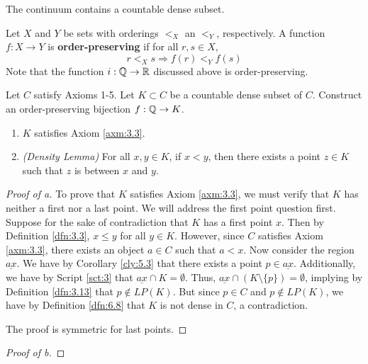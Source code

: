 \documentclass[../main.tex]{subfiles}
\begin{document}
\begin{axiom}\label{axm:6.5}
    The continuum contains a countable dense subset.
\end{axiom}

\begin{definition}\label{dfn:6.15}
    Let $X$ and $Y$ be sets with orderings $<_X$ an $<_Y$, respectively. A function $f:X\to Y$ is \textbf{order-preserving} if for all $r,s\in X$,
    \begin{equation*}
        r<_Xs \Longrightarrow f(r)<_Yf(s)
    \end{equation*}
    Note that the function $i:\mathbb{Q}\to\mathbb{R}$ discussed above is order-preserving.
\end{definition}

\begin{exercise}\label{exr:6.16}
    Let $C$ satisfy Axioms 1-5. Let $K\subset C$ be a countable dense subset of $C$. Construct an order-preserving bijection $f:\mathbb{Q}\to K$.
    \begin{lemma*}\leavevmode
        \begin{enumerate}[label={\alph*\textup{)}}]
            \item $K$ satisfies Axiom \ref{axm:3.3}.
            \item \emph{(Density Lemma)} For all $x,y\in K$, if $x<y$, then there exists a point $z\in K$ such that $z$ is between $x$ and $y$.
        \end{enumerate}
        \begin{proof}[Proof of a]
            To prove that $K$ satisfies Axiom \ref{axm:3.3}, we must verify that $K$ has neither a first nor a last point. We will address the first point question first. Suppose for the sake of contradiction that $K$ has a first point $x$. Then by Definition \ref{dfn:3.3}, $x\leq y$ for all $y\in K$. However, since $C$ satisfies Axiom \ref{axm:3.3}, there exists an object $a\in C$ such that $a<x$. Now consider the region $\underline{ax}$. We have by Corollary \ref{cly:5.3} that there exists a point $p\in\underline{ax}$. Additionally, we have by Script \ref{sct:3} that $\underline{ax}\cap K=\emptyset$. Thus, $\underline{ax}\cap(K\setminus\{p\})=\emptyset$, implying by Definition \ref{dfn:3.13} that $p\notin LP(K)$. But since $p\in C$ and $p\notin LP(K)$, we have by Definition \ref{dfn:6.8} that $K$ is not dense in $C$, a contradiction.\par
            The proof is symmetric for last points.
        \end{proof}
        \begin{proof}[Proof of b]

\end{proof}
\end{lemma*}
\end{exercise}
\end{document}
